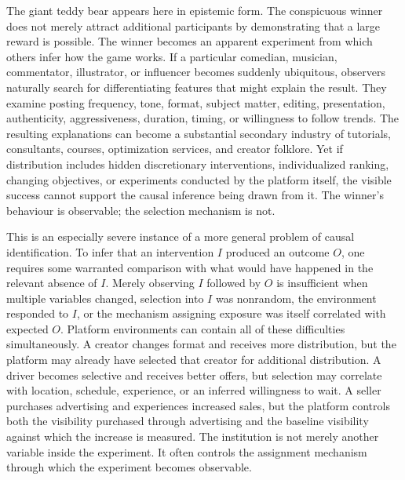 \documentclass[11pt]{article}
\begin{document}
The giant teddy bear appears here in epistemic form. The conspicuous winner does not merely attract additional participants by demonstrating that a large reward is possible. The winner becomes an apparent experiment from which others infer how the game works. If a particular comedian, musician, commentator, illustrator, or influencer becomes suddenly ubiquitous, observers naturally search for differentiating features that might explain the result. They examine posting frequency, tone, format, subject matter, editing, presentation, authenticity, aggressiveness, duration, timing, or willingness to follow trends. The resulting explanations can become a substantial secondary industry of tutorials, consultants, courses, optimization services, and creator folklore. Yet if distribution includes hidden discretionary interventions, individualized ranking, changing objectives, or experiments conducted by the platform itself, the visible success cannot support the causal inference being drawn from it. The winner's behaviour is observable; the selection mechanism is not.

This is an especially severe instance of a more general problem of causal identification. To infer that an intervention \(I\) produced an outcome \(O\), one requires some warranted comparison with what would have happened in the relevant absence of \(I\). Merely observing \(I\) followed by \(O\) is insufficient when multiple variables changed, selection into \(I\) was nonrandom, the environment responded to \(I\), or the mechanism assigning exposure was itself correlated with expected \(O\). Platform environments can contain all of these difficulties simultaneously. A creator changes format and receives more distribution, but the platform may already have selected that creator for additional distribution. A driver becomes selective and receives better offers, but selection may correlate with location, schedule, experience, or an inferred willingness to wait. A seller purchases advertising and experiences increased sales, but the platform controls both the visibility purchased through advertising and the baseline visibility against which the increase is measured. The institution is not merely another variable inside the experiment. It often controls the assignment mechanism through which the experiment becomes observable.
\end{document}
